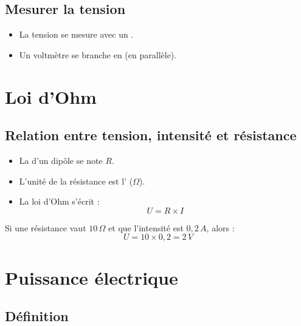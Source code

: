 \documentclass[12pt]{article}
\begin{document}
\subsection{Mesurer la tension}

\begin{itemize}
    \item La tension se mesure avec un .
    \item Un voltmètre se branche en  (en parallèle).
\end{itemize}

\section{Loi d’Ohm}

\subsection{Relation entre tension, intensité et résistance}

\begin{center}
\end{center}


\begin{itemize}
    \item La  d’un dipôle se note \(R\).
    \item L’unité de la résistance est l’ (\(\Omega\)).
    \item La loi d’Ohm s’écrit :
\[
U = R \times I
\]
\end{itemize}

\begin{exemple}{}{}
    Si une résistance vaut \(10\,\Omega\) et que l’intensité est \(0{,}2\,A\), alors :
\[
U = 10 \times 0{,}2 = 2\,V
\]
\end{exemple}

\section{Puissance électrique}

\subsection{Définition}
\end{document}
